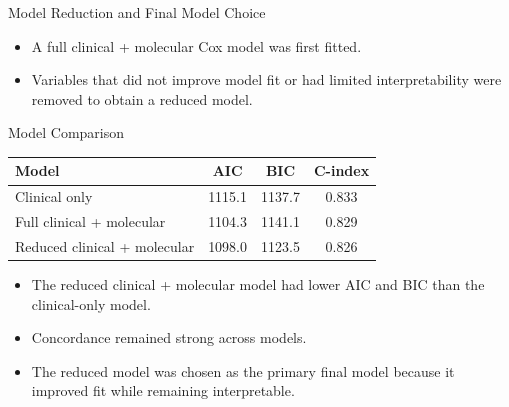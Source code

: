 \documentclass{beamer}
\begin{document}
\begin{frame}{Model Reduction and Final Model Choice}
\begin{itemize}
    \item A full clinical + molecular Cox model was first fitted.
    \item Variables that did not improve model fit or had limited interpretability were removed to obtain a reduced model.
\end{itemize}
\end{frame}

\begin{frame}{Model Comparison}
\centering
\begin{tabular}{lccc}
    \toprule
    Model & AIC & BIC & C-index \\
    \midrule
    Clinical only & 1115.1 & 1137.7 & 0.833 \\
    Full clinical + molecular & 1104.3 & 1141.1 & 0.829 \\
    Reduced clinical + molecular & 1098.0 & 1123.5 & 0.826 \\
    \bottomrule
\end{tabular}

\vspace{0.3cm}

\begin{itemize}
    \item The reduced clinical + molecular model had lower AIC and BIC than the clinical-only model.
    \item Concordance remained strong across models.
    \item The reduced model was chosen as the primary final model because it improved fit while remaining interpretable.
\end{itemize}
\end{frame}
\end{document}
